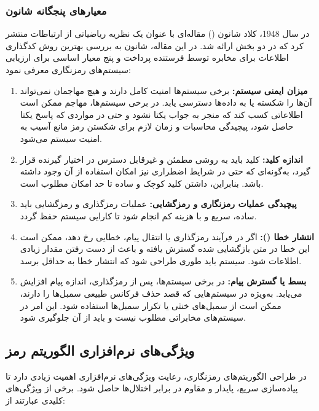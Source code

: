 \subsubsection{معیارهای پنجگانه شانون}
در سال 1948، کلاد شانون (\protect{}) مقاله‌ای با عنوان یک نظریه ریاضیاتی از ارتباطات منتشر کرد که در دو بخش ارائه شد. در این مقاله، شانون به بررسی بهترین روش کدگذاری اطلاعات برای مخابره توسط فرستنده پرداخت و پنج معیار اساسی برای ارزیابی سیستم‌های رمزنگاری معرفی نمود\cite{ref39}:

\begin{enumerate}
    \item \textbf{میزان ایمنی سیستم:} برخی سیستم‌ها امنیت کامل دارند و هیچ مهاجمان نمی‌تواند آن‌ها را شکسته یا به داده‌ها دسترسی یابد. در برخی سیستم‌ها، مهاجم ممکن است اطلاعاتی کسب کند که منجر به جواب یکتا نشود و حتی در مواردی که پاسخ یکتا حاصل شود، پیچیدگی محاسبات و زمان لازم برای شکستن رمز مانع آسیب به امنیت سیستم می‌شود.
    \item \textbf{اندازه کلید:} کلید باید به روشی مطمئن و غیرقابل دسترس در اختیار گیرنده قرار گیرد، به‌گونه‌ای که حتی در شرایط اضطراری نیز امکان استفاده از آن وجود داشته باشد. بنابراین، داشتن کلید کوچک و ساده تا حد امکان مطلوب است.
    \item \textbf{پیچیدگی عملیات رمزنگاری و رمزگشایی:} عملیات رمزگذاری و رمزگشایی باید ساده، سریع و با هزینه کم انجام شود تا کارایی سیستم حفظ گردد.
    \item \textbf{انتشار خطا ():} اگر در فرآیند رمزگذاری یا انتقال پیام، خطایی رخ دهد، ممکن است این خطا در متن بازگشایی شده گسترش یافته و باعث از دست رفتن مقدار زیادی اطلاعات شود. سیستم باید طوری طراحی شود که انتشار خطا به حداقل برسد.
    \item \textbf{بسط یا گسترش پیام:} در برخی سیستم‌ها، پس از رمزگذاری، اندازه پیام افزایش می‌یابد. به‌ویژه در سیستم‌هایی که قصد حذف فرکانس طبیعی سمبل‌ها را دارند، ممکن است از سمبل‌های خنثی یا تکرار سمبل‌ها استفاده شود. این امر در سیستم‌های مخابراتی مطلوب نیست و باید از آن جلوگیری شود.
\end{enumerate}

\subsection{ویژگی‌های نرم‌افزاری الگوریتم رمز}
در طراحی الگوریتم‌های رمزنگاری، رعایت ویژگی‌های نرم‌افزاری اهمیت زیادی دارد تا پیاده‌سازی سریع، پایدار و مقاوم در برابر اختلال‌ها حاصل شود. برخی از ویژگی‌های کلیدی عبارتند از\cite{ref41}:

